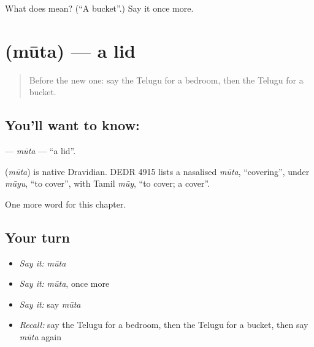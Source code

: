 \begin{tcolorbox}[breakable,colback=teal!4,colframe=teal!35!black,title={Before you move on}]
What does  mean? (\textquotedblleft{}A bucket\textquotedblright{}.) Say it once more.
\end{tcolorbox}
\section[\texorpdfstring{\te{మూత} (mūta)}{మూత (mūta)}]{ (mūta) — a lid}

\label{lesson:TE-C183-muta}



\begin{quote}
Before the new one: say the Telugu for a bedroom, then the Telugu for a bucket.
\end{quote}

\subsection*{You'll want to know: }
\textbf{} — \emph{mūta} — \textquotedblleft{}a lid\textquotedblright{}.

\begin{cousinweb}
\textbf{} (\emph{mūta}) is native Dravidian. DEDR 4915 lists a nasalised \emph{mūta}, \textquotedblleft{}covering\textquotedblright{}, under \emph{mūyu}, \textquotedblleft{}to cover\textquotedblright{}, with Tamil \emph{mūy}, \textquotedblleft{}to cover; a cover\textquotedblright{}.
\end{cousinweb}

\begin{grammarlens}[title={What you've built}]
One more word for this chapter.
\end{grammarlens}

\subsection*{Your turn}
\begin{itemize}
\raggedright
  \item \emph{Say it:} \emph{mūta}
  \item \emph{Say it:} \emph{mūta}, once more
  \item \emph{Say it:} say \emph{mūta}
  \item \emph{Recall:} say the Telugu for a bedroom, then the Telugu for a bucket, then say \emph{mūta} again
\end{itemize}

